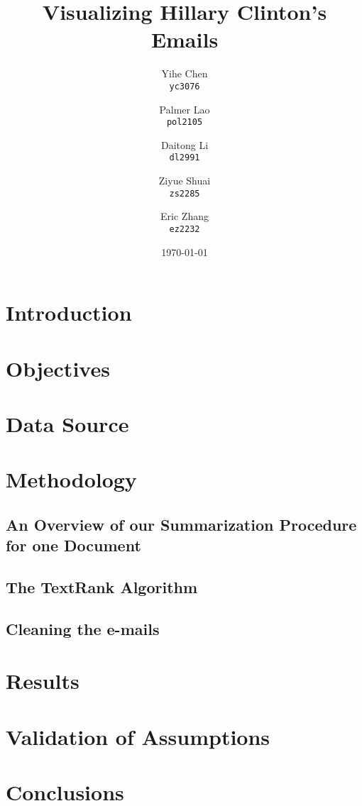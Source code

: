 \documentclass[11pt]{article}
\begin{document}
\title{Visualizing Hillary Clinton's Emails}

\author{
  Yihe Chen \\
  \texttt{yc3076}
  \and 
  Palmer Lao \\
  \texttt{pol2105}
  \and
  Daitong Li \\
  \texttt{dl2991}
  \and
  Ziyue Shuai \\
  \texttt{zs2285}
  \and
  Eric Zhang \\ 
  \texttt{ez2232}
}

\date{\today}
\maketitle
\doublespacing


\section{Introduction}


\section{Objectives}


\section{Data Source}


\section{Methodology}

\subsection{An Overview of our Summarization Procedure for one Document}


\subsection{The TextRank Algorithm}


\subsection{Cleaning the e-mails}


\section{Results}

\section{Validation of Assumptions}

\section{Conclusions}



\end{document}
